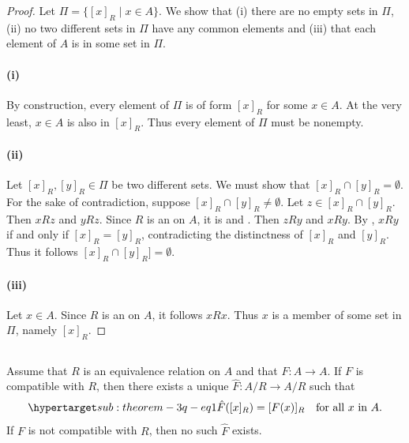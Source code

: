 \documentclass{report}
\begin{document}
\begin{proof}


  Let $\Pi = \{[x]_R \mid x \in A\}$.
  We show that (i) there are no empty sets in $\Pi$, (ii) no two different sets
    in $\Pi$ have any common elements and (iii) that each element of $A$ is in
    some set in $\Pi$.

  \paragraph{(i)}%

    By construction, every element of $\Pi$ is of form $[x]_R$ for some
      $x \in A$.
    At the very least, $x \in A$ is also in $[x]_R$.
    Thus every element of $\Pi$ must be nonempty.

  \paragraph{(ii)}%

    Let $[x]_R, [y]_R \in \Pi$ be two different sets.
    We must show that $[x]_R \cap [y]_R = \emptyset$.
    For the sake of contradiction, suppose $[x]_R \cap [y]_R \neq \emptyset$.
    Let $z \in [x]_R \cap [y]_R$.
    Then $xRz$ and $yRz$.
    Since $R$ is an  on $A$, it is
       and .
    Then $zRy$ and $xRy$.
    By , $xRy$ if and only if $[x]_R = [y]_R$,
      contradicting the distinctness of $[x]_R$ and $[y]_R$.
    Thus it follows $[x]_R \cap [y]_R] = \emptyset$.

  \paragraph{(iii)}%

    Let $x \in A$.
    Since $R$ is an  on $A$, it follows
      $xRx$.
    Thus $x$ is a member of some set in $\Pi$, namely $[x]_R$.

\end{proof}

\subsection{}%

\begin{theorem}[3Q]

  Assume that $R$ is an equivalence relation on $A$ and that
    $F \colon A \rightarrow A$.
  If $F$ is compatible with $R$, then there exists a unique
    $\hat{F} \colon A / R \rightarrow A / R$ such that
    \begin{equation}
      \hyperlabel{sub:theorem-3q-eq1}
      \hat{F}([x]_R) = [F(x)]_R \quad\text{for all } x \text{ in } A.
    \end{equation}
  If $F$ is not compatible with $R$, then no such $\hat{F}$ exists.

\end{theorem}
\end{document}

